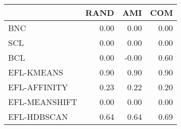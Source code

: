 \begin{tabular}{lrrr}
\toprule
 & RAND & AMI & COM \\
\midrule
BNC & 0.00 & 0.00 & 0.00 \\
SCL & 0.00 & 0.00 & 0.00 \\
BCL & 0.00 & -0.00 & 0.60 \\
EFL-KMEANS & 0.90 & 0.90 & 0.90 \\
EFL-AFFINITY & 0.23 & 0.22 & 0.20 \\
EFL-MEANSHIFT & 0.00 & 0.00 & 0.00 \\
EFL-HDBSCAN & 0.64 & 0.64 & 0.69 \\
\bottomrule
\end{tabular}
